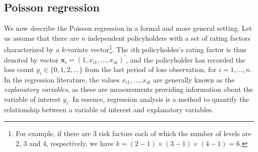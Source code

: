 \documentclass[12pt]{article}
\begin{document}
%
%
%
%
%

\subsection{Poisson regression}
We now describe the Poisson regression in a formal and more general setting. Let us assume that there are $n$ independent policyholders with a set of rating factors characterized by a $k$-variate vector\footnote{For example, if there are 3 risk factors each of which the number of levels are 2, 3 and 4, respectively, we have $k=(2-1)\times(3-1)\times (4-1)=6$.}. The $i$th policyholder's rating factor is thus denoted by vector $\mathbf{ x}_i=(1, x_{i1}, \ldots, x_{ik})^{\prime}$, and the policyholder has recorded the loss count $y_i \in \{0,1,2, \ldots \}$ from the last period of loss observation, for $i=1, \ldots, n$. In the regression literature, the values $x_{i1}, \ldots, x_{ik}$ are generally known as the \textit{explanatory variables}, as these are measurements providing information about the variable of interest $y_i$. In essence, regression analysis is a method to quantify the relationship between a variable of interest and explanatory variables. \\
\end{document}
